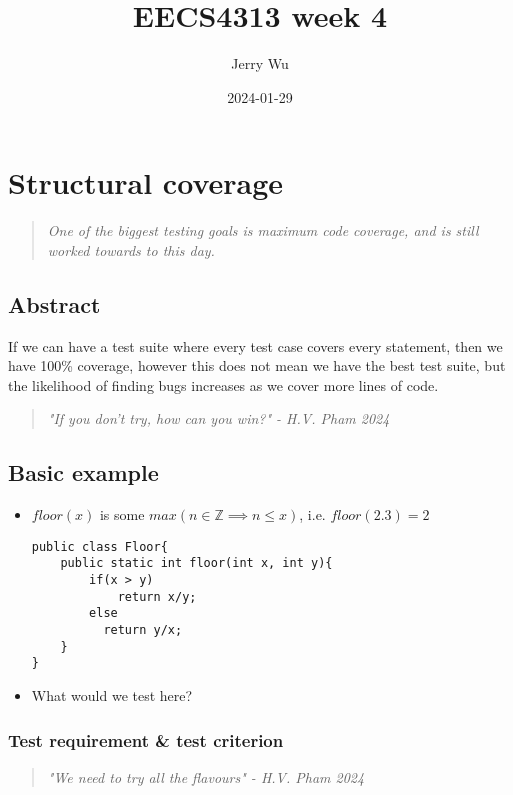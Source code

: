 \documentclass[12pt]{book}
\title{EECS4313 week 4}
\author{Jerry Wu}
\date{2024-01-29}
\begin{document}
\maketitle
\tableofcontents

\chapter{Structural coverage}

\begin{quote}
  \textit{One of the biggest testing goals is maximum code coverage, and is still worked towards to this day.}
\end{quote}
\section{Abstract}
If we can have a test suite where every test case covers every statement, then we have 100\% coverage, however this does not mean we have the best test suite, but the likelihood of finding bugs increases as we cover more lines of code.

\begin{quote}
    \textit{"If you don't try, how can you win?" - H.V. Pham 2024}
\end{quote}

\section{Basic example}

\begin{itemize}
  \item $floor(x)$ is some $max(n\in \mathbb{Z}\implies n\leq x)$, i.e. $floor(2.3)=2$
  \begin{lstlisting}
public class Floor{
    public static int floor(int x, int y){
        if(x > y)
            return x/y;
        else
          return y/x;
    }
}
  \end{lstlisting}

  \item What would we test here?
\end{itemize}

\subsection{Test requirement \& test criterion}

\begin{quote}
  \textit{"We need to try all the flavours" - H.V. Pham 2024}
\end{quote}
\end{document}
